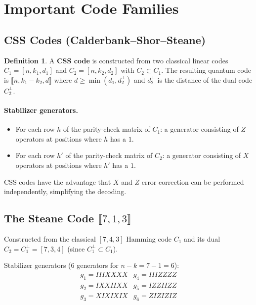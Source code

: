 \documentclass[11pt]{article}
\theoremstyle{definition}
\newtheorem{definition}{Definition}[section]
\begin{document}
\section{Important Code Families}

\subsection{CSS Codes (Calderbank--Shor--Steane)}

\begin{definition}
A \textbf{CSS code} is constructed from two classical linear codes $C_1=[n,k_1,d_1]$ and $C_2=[n,k_2,d_2]$ with $C_2\subset C_1$.  The resulting quantum code is $\llbracket n,k_1-k_2,d\rrbracket$ where $d\ge\min(d_1,d_2^\perp)$ and $d_2^\perp$ is the distance of the dual code $C_2^\perp$.
\end{definition}

\paragraph{Stabilizer generators.}
\begin{itemize}
    \item For each row $h$ of the parity-check matrix of $C_1$: a generator consisting of $Z$ operators at positions where $h$ has a $1$.
    \item For each row $h'$ of the parity-check matrix of $C_2$: a generator consisting of $X$ operators at positions where $h'$ has a $1$.
\end{itemize}

CSS codes have the advantage that $X$ and $Z$ error correction can be performed independently, simplifying the decoding.

\subsection{The Steane Code $\llbracket 7,1,3\rrbracket$}

Constructed from the classical $[7,4,3]$ Hamming code $C_1$ and its dual $C_2=C_1^\perp=[7,3,4]$ (since $C_1^\perp\subset C_1$).

Stabilizer generators (6 generators for $n-k=7-1=6$):
\[
\begin{array}{ll}
g_1 = IIIXXXX & g_4 = IIIZZZZ \\
g_2 = IXXIIXX & g_5 = IZZIIZZ \\
g_3 = XIXIXIX & g_6 = ZIZIZIZ
\end{array}
\]
\end{document}
